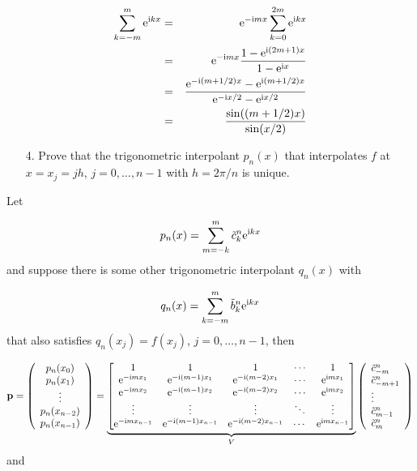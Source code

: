 \documentclass[12pt,a4paper]{article}
\begin{document}
\begin{eqnarray*}
\sum_{k=-m}^{m} {\rm e}^{{\rm i}kx} &=& {\rm e}^{-{\rm i}mx}\sum_{k=0}^{2m} {\rm e}^{{\rm i}kx} \\
&=& {\rm e}^{-{\rm i}mx}\frac{1 -  {\rm e}^{{\rm i}(2m+1)x}}{1 -  {\rm e}^{{\rm i}x}} \\
&=& \frac{{\rm e}^{-{\rm i}(m+1/2)x} -  {\rm e}^{{\rm i}(m+1/2)x}}{{\rm e}^{-{\rm i}x/2} -  {\rm e}^{{\rm i}x/2}} \\
&=& \frac{\sin((m+1/2)x)}{\sin(x/2)}
\end{eqnarray*}
\begin{itemize}
\item[4. ] Prove that the trigonometric interpolant $p_n(x)$ that interpolates $f$ at $x = x_j = jh$, $j  = 0, \ldots, n-1$ with $h = 2\pi/n$ is unique.

\end{itemize}
Let 

\[
p_n(x) = \sum_{m = -k}^{m}\tilde{c}^n_k{\rm e}^{{\rm i}kx}
\]
and suppose there is some other trigonometric interpolant $q_n(x)$ with

\[
q_n(x) = \sum_{k = -m}^{m}\tilde{b}^n_k{\rm e}^{{\rm i}kx}
\]
that also satisfies $q_n(x_j) = f(x_j)$, $j = 0, \ldots, n-1$, then

\[
\mathbf{p} = \left(
\begin{array}{c}
p_n(x_0) \\
p_n(x_1) \\
\vdots \\
p_n(x_{n-2}) \\
p_n(x_{n-1})
\end{array}
\right)
=
\underbrace{\begin{bmatrix}
1 & 1 & 1&  \ensuremath{\cdots} & 1 \\
{\rm e}^{-{\rm i}m x_1} & {\rm e}^{-{\rm i}(m-1) x_1} &  {\rm e}^{-{\rm i}(m-2) x_1} & \ensuremath{\cdots} & {\rm e}^{{\rm i} m x_1} \\
{\rm e}^{-{\rm i}m x_2} & {\rm e}^{-{\rm i}(m-1) x_2} &  {\rm e}^{-{\rm i}(m-2) x_2} & \ensuremath{\cdots} & {\rm e}^{{\rm i} m x_2} \\
\ensuremath{\vdots} & \ensuremath{\vdots} & \ensuremath{\vdots} & \ensuremath{\ddots} & \ensuremath{\vdots} \\
{\rm e}^{-{\rm i}m x_{n-1}}& {\rm e}^{-{\rm i}(m-1)x_{n-1}}& {\rm e}^{-{\rm i}(m-2)x_{n-1}}& \cdots & {\rm e}^{{\rm i}m x_{n-1}}
\end{bmatrix}}_{V} 
\left(
\begin{array}{l}
\tilde{c}^n_{-m} \\
\tilde{c}^n_{-m+1} \\
\vdots \\
\tilde{c}^n_{m-1} \\
\tilde{c}^n_{m}
\end{array}
\right)
\]
and
\end{document}
